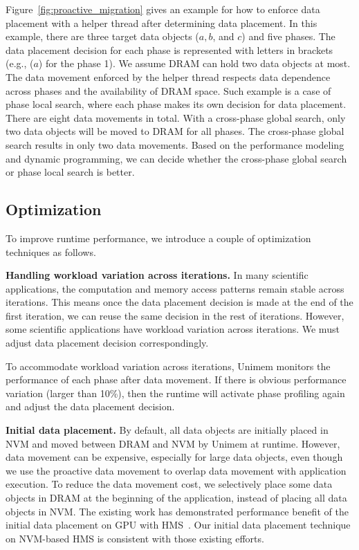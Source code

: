 Figure~\ref{fig:proactive_migration} gives an example for how to enforce data placement with a helper thread after determining data placement. In this example, there are three target data objects ($a, b$, and $c$) and five phases. The data placement decision for each phase
is represented with letters in brackets (e.g., ($a$) for the phase 1). 
We assume DRAM can hold two data objects at most. 
The data movement enforced by the helper thread respects data dependence across phases and the availability of DRAM space. Such example is a case of phase local search, where each phase makes 
its own decision for data placement. There are eight data movements in total. With a cross-phase global search, only two data objects will be moved to DRAM for all phases. %
The cross-phase global search results in only two data movements.
Based on the performance modeling and dynamic programming, we can decide whether the cross-phase global search or phase local search is better. 
\vspace{-10pt}

\subsection{Optimization}
\label{sec:opt}
To improve runtime performance, we introduce a couple of optimization techniques as follows.

\textbf{Handling workload variation across iterations.}
In many scientific applications, the computation and memory access patterns remain stable across iterations.
This means once the data placement decision is made at the end of the first iteration, 
we can reuse the same decision in the rest of iterations.
However, some scientific applications have workload variation across iterations.
We must adjust data placement decision correspondingly.

To accommodate workload variation across iterations, Unimem monitors the performance of each phase after data movement. If there is obvious performance variation (larger than 10\%),
then the runtime will activate phase profiling again and adjust the data placement decision. 

\textbf{Initial data placement.} 
By default, all data objects are initially placed in NVM and moved between DRAM and NVM by Unimem at runtime.
However, data movement can be expensive, especially for large data objects, even though we use the proactive data movement to overlap data movement
with application execution.
To reduce the data movement cost, we selectively
place some data objects in DRAM at the beginning of the application, instead of placing all data objects in NVM. 
The existing work has demonstrated performance benefit of the initial data placement on GPU with HMS~\cite{asplos15:agarwal, pcm_gpu_pact13}.
Our initial data placement technique on NVM-based HMS is consistent with those existing efforts.

